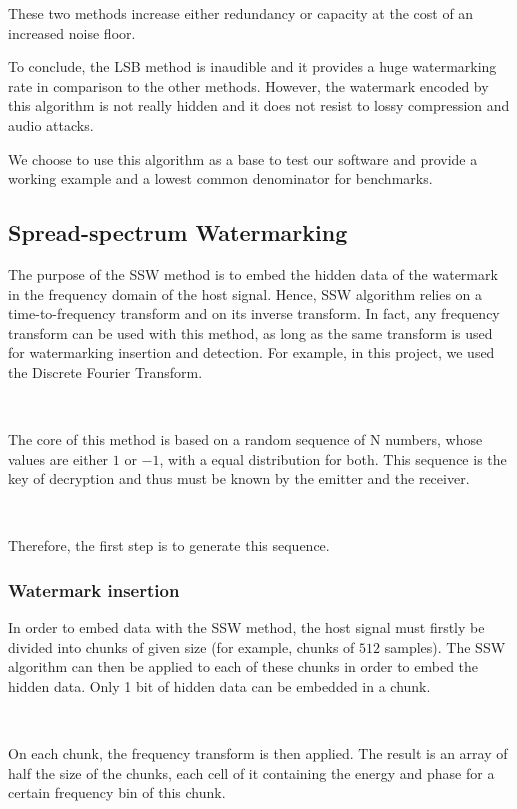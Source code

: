 These two methods increase either redundancy or capacity at the cost of an increased noise floor.

To conclude, the \ac{LSB} method is inaudible and it provides a huge watermarking rate in comparison to the other methods. However, the watermark encoded by this algorithm is not really hidden and it does not resist to lossy compression and audio attacks.

We choose to use this algorithm as a base to test our software and provide a working example and a lowest common denominator for benchmarks.
\subsection{Spread-spectrum Watermarking}

The purpose of the \ac{SSW} method is to embed the hidden data of the watermark in the frequency domain of the host signal. Hence, \ac{SSW} algorithm relies on a time-to-frequency transform and on its inverse transform. In fact, any frequency transform can be used with this method, as long as the same transform is used for watermarking insertion and detection. For example, in this project, we used the Discrete Fourier Transform.

~

The core of this method is based on a random sequence of N numbers, whose values are either $1$ or $-1$, with a equal distribution for both. This sequence is the key of decryption and thus must be known by the emitter and the receiver.

~

Therefore, the first step is to generate this sequence.

\subsubsection{Watermark insertion}

In order to embed data with the \ac{SSW} method, the host signal must firstly be divided into chunks of given size (for example, chunks of $512$ samples). The \ac{SSW} algorithm can then be applied to each of these chunks in order to embed the hidden data. Only 1 bit of hidden data can be embedded in a chunk.

~

On each chunk, the frequency transform is then applied. The result is an array of half the size of the chunks, each cell of it containing the energy and phase for a certain frequency bin of this chunk.

